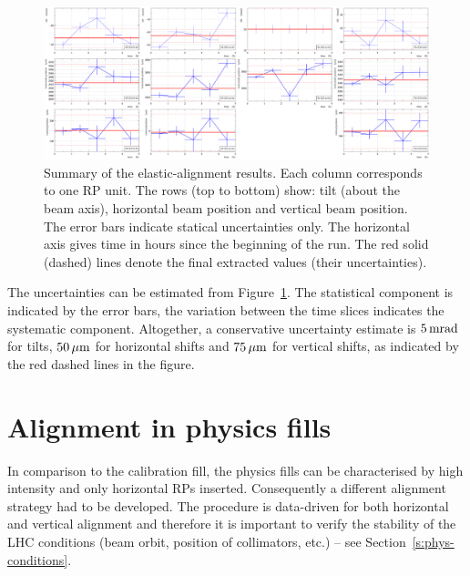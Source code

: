 \documentclass[TOTEM]{cern/cernphprep}
\def\un#1{\,{\rm #1}}
\begin{document}
\begin{figure}[h!]
\begin{center}
\includegraphics[width=\hsize]{fig/calibration_fill/el_alignment.pdf}
\caption{%
Summary of the elastic-alignment results. Each column corresponds to one RP unit. The rows (top to bottom) show: tilt (about the beam axis), horizontal beam position and vertical beam position. The error bars indicate statical uncertainties only. The horizontal axis gives time in hours since the beginning of the run. The red solid (dashed) lines denote the final extracted values (their uncertainties).
}
\label{fig:el_alignment_results}
\end{center}
\end{figure}

The uncertainties can be estimated from Figure~\ref{fig:el_alignment_results}. The statistical component is indicated by the error bars, the variation between the time slices indicates the systematic component. Altogether, a conservative uncertainty estimate is $5\un{mrad}$ for tilts, $50\un{\mu m}$ for horizontal shifts and $75\un{\mu m}$ for vertical shifts, as indicated by the red dashed lines in the figure.


\section{Alignment in physics fills}
\label{s:phys}

In comparison to the calibration fill, the physics fills can be characterised by high intensity and only horizontal RPs inserted. Consequently a different alignment strategy had to be developed. The procedure is data-driven for both horizontal and vertical alignment and therefore it is important to verify the stability of the LHC conditions (beam orbit, position of collimators, etc.) -- see Section~\ref{s:phys-conditions}.
\end{document}
